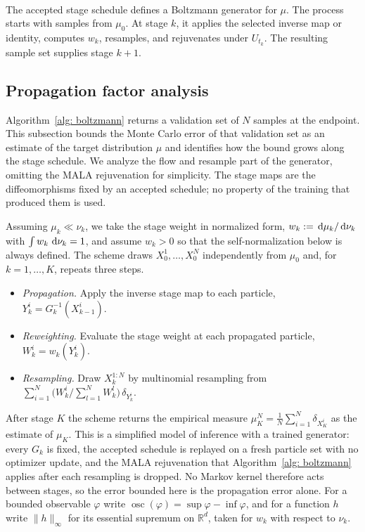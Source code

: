 \documentclass{article}
\begin{document}
\mbox{}\\
The accepted stage schedule defines a Boltzmann generator for $\mu$. The process starts with samples from $\mu_0$. At stage $k$, it applies the selected inverse map or identity, computes $w_k$, resamples, and rejuvenates under $U_{t_k}$. The resulting sample set supplies stage $k+1$.

\subsection{Propagation factor analysis}
\label{sec: propagation-analysis}

Algorithm~\ref{alg: boltzmann} returns a validation set of $N$ samples at the endpoint. This subsection bounds the Monte Carlo error of that validation set as an estimate of the target distribution $\mu$ and identifies how the bound grows along the stage schedule. We analyze the flow and resample part of the generator, omitting the MALA rejuvenation for simplicity. The stage maps are the diffeomorphisms fixed by an accepted schedule; no property of the training that produced them is used.

Assuming $\mu_k \ll \nu_k$, we take the stage weight in normalized form, $w_k := \,\mathrm d\mu_k/\,\mathrm d\nu_k$ with $\int w_k \, \,\mathrm d\nu_k = 1$, and assume $w_k > 0$ so that the self-normalization below is always defined. The scheme draws $X_0^1,\dots,X_0^N$ independently from $\mu_0$ and, for $k=1,\dots,K$, repeats three steps.
\begin{itemize}
    \item \emph{Propagation.} Apply the inverse stage map to each particle, $Y_k^i = G_k^{-1}(X_{k-1}^i)$.
    \item \emph{Reweighting.} Evaluate the stage weight at each propagated particle, $W_k^i = w_k(Y_k^i)$.
    \item \emph{Resampling.} Draw $X_k^{1:N}$ by multinomial resampling from $\sum_{i=1}^{N} \bigl(W_k^i/\sum_{l=1}^{N} W_k^l\bigr)\,\delta_{Y_k^i}$.
\end{itemize}
After stage $K$ the scheme returns the empirical measure $\mu_K^N = \frac1N\sum_{i=1}^{N} \delta_{X_K^i}$ as the estimate of $\mu_K$. This is a simplified model of inference with a trained generator: every $G_k$ is fixed, the accepted schedule is replayed on a fresh particle set with no optimizer update, and the MALA rejuvenation that Algorithm~\ref{alg: boltzmann} applies after each resampling is dropped. No Markov kernel therefore acts between stages, so the error bounded here is the propagation error alone. For a bounded observable $\varphi$ write $\operatorname{osc}(\varphi) = \sup\varphi - \inf\varphi$, and for a function $h$ write $\lVert h \rVert_\infty$ for its essential supremum on $\mathbb R^d$, taken for $w_k$ with respect to $\nu_k$.
\end{document}
